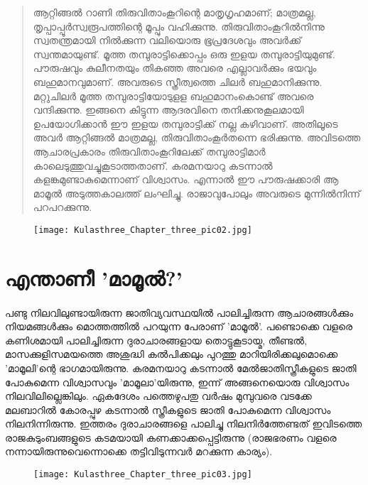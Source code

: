 \begin{quotation}
ആറ്റിങ്ങൽ റാണി തിരുവിതാംകൂറിന്റെ മാതൃഗൃഹമാണ്; മാത്രമല്ല, തൃപ്പാപ്പൂർസ്വരൂപത്തിന്റെ മൂപ്പും വഹിക്കുന്നു. തിരുവിതാംകൂറിൽനിന്നു സ്വതന്ത്രമായി നിൽക്കുന്ന വലിയൊരു ഭൂപ്രദേശവും അവർക്ക് സ്വന്തമായുണ്ട്. മൂത്ത തമ്പുരാട്ടിക്കൊപ്പം ഒരു ഇളയ തമ്പുരാട്ടിയുമുണ്ട്. പൗരുഷവും കുലീനതയും തികഞ്ഞ അവരെ എല്ലാവർക്കും ഭയവും ബഹുമാനവുമാണ്. അവരുടെ സ്ത്രീത്വത്തെ ചിലർ ബഹുമാനിക്കുന്നു. മറ്റുചിലർ മൂത്ത തമ്പുരാട്ടിയോടുളള ബഹുമാനംകൊണ്ട് അവരെ വന്ദിക്കുന്നു. ഇങ്ങനെ കിട്ടുന്ന ആദരവിനെ തനിക്കനുകൂലമായി ഉപയോഗിക്കാൻ ഈ ഇളയ തമ്പുരാട്ടിക്ക് നല്ല കഴിവാണ്. അതിലൂടെ അവർ ആറ്റിങ്ങൽ മാത്രമല്ല, തിരുവിതാംകൂർതന്നെ ഭരിക്കുന്നു. അവിടത്തെ ആചാരപ്രകാരം തിരുവിതാംകൂറിലേക്ക് തമ്പുരാട്ടിമാർ കാലെടുത്തുവച്ചുകൂടാത്തതാണ്. കരമനയാറു കടന്നാൽ കളങ്കമുണ്ടാകുമെന്നാണ് വിശ്വാസം. എന്നാൽ ഈ പൗരുഷക്കാരി ആ മാമൂൽ അടുത്തകാലത്ത് ലംഘിച്ചു. രാജാവുപോലും അവരുടെ മുന്നിൽനിന്ന് പറപറക്കുന്നു.
\end{quotation}
\begin{figure}[h]
\begin{center}
\texttt{[image: Kulasthree\_Chapter\_three\_pic02.jpg]}
\end{center}
\end{figure}

\section{എന്താണീ 'മാമൂൽ?'}
\label{ch3sec2}
\paragraph{}
പണ്ടു നിലവിലുണ്ടായിരുന്ന ജാതിവ്യവസ്ഥയിൽ പാലിച്ചിരുന്ന ആചാരങ്ങൾക്കും നിയമങ്ങൾക്കും മൊത്തത്തിൽ പറയുന്ന പേരാണ് 'മാമൂൽ'. പണ്ടൊക്കെ വളരെ കണിശമായി പാലിച്ചിരുന്ന ദുരാചാരങ്ങളായ തൊട്ടുകൂടായ്മ, തീണ്ടൽ, മാസക്കുളിസമയത്തെ അശുദ്ധി കൽപിക്കലും പുറത്തു മാറിയിരിക്കലുമൊക്കെ 'മാമൂലി'ന്റെ ഭാഗമായിരുന്നു. കരമനയാറു കടന്നാൽ മേൽജാതിസ്ത്രീകളുടെ ജാതി പോകുമെന്ന വിശ്വാസവും 'മാമൂലാ'യിരുന്നു, ഇന്ന് അങ്ങനെയൊരു വിശ്വാസം നിലവിലില്ലെങ്കിലും. ഏകദേശം പത്തെഴുപതു വർഷം മുമ്പുവരെ വടക്കേ മലബാറിൽ കോരപ്പുഴ കടന്നാൽ സ്ത്രീകളുടെ ജാതി പോകുമെന്ന വിശ്വാസം നിലനിന്നിരുന്നു. ഇത്തരം ദുരാചാരങ്ങളെ പാലിച്ചു നിലനിർത്തേണ്ടത് ഇവിടത്തെ രാജകുടുംബങ്ങളുടെ കടമയായി കണക്കാക്കപ്പെട്ടിരുന്നു (രാജഭരണം വളരെ നന്നായിരുന്നുവെന്നൊക്കെ തട്ടിവിടുന്നവർ മറക്കുന്ന കാര്യം).

\begin{figure}[h]
\begin{center}
\texttt{[image: Kulasthree\_Chapter\_three\_pic03.jpg]}
\end{center}
\end{figure}

